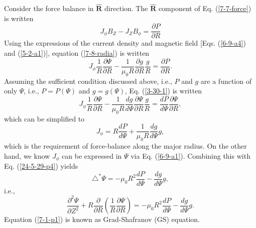 \documentclass{llncs}
\begin{document}
Consider the force balance in $\hat{\mathbf{R}}$ direction. The
$\hat{\mathbf{R}}$ component of Eq. (\ref{7-7-force}) is written
\begin{equation}
  \label{7-8-radia} J_{\phi} B_Z - J_Z B_{\phi} = \frac{\partial P}{\partial
  R}
\end{equation}
Using the expressions of the current density and magnetic field [Eqs.
(\ref{6-9-a4}) and (\ref{5-2-a1})], equation (\ref{7-8-radia}) is written
\begin{equation}
  \label{3-30-1} J_{\phi} \frac{1}{R} \frac{\partial \Psi}{\partial R} -
  \frac{1}{\mu_0 R} \frac{\partial g}{\partial R}  \frac{g}{R} =
  \frac{\partial P}{\partial R} .
\end{equation}
Assuming the sufficient condition discussed above, i.e., $P$ and $g$ are a
function of only $\Psi$, i.e., $P = P (\Psi)$ and $g = g (\Psi)$, Eq.
(\ref{3-30-1}) is written
\begin{equation}
  J_{\phi} \frac{1}{R} \frac{\partial \Psi}{\partial R} - \frac{1}{\mu_0 R}
  \frac{d g}{d \Psi} \frac{\partial \Psi}{\partial R}  \frac{g}{R} = \frac{d
  P}{d \Psi} \frac{\partial \Psi}{\partial R},
\end{equation}
which can be simplified to
\begin{equation}
  \label{24-5-29-p4} J_{\phi} = R \frac{d P}{d \Psi} + \frac{1}{\mu_0 R}
  \frac{d g}{d \Psi} g,
\end{equation}
which is the requirement of force-balance along the major radius. On the other
hand, we know $J_{\phi}$ can be expressed in $\Psi$ via Eq. (\ref{6-9-a1}).
Combining this with Eq. (\ref{24-5-29-p4}) yields
\begin{equation}
  \triangle^{\ast} \Psi = - \mu_0 R^2 \frac{d P}{d \Psi} - \frac{d g}{d \Psi}
  g,
\end{equation}
i.e.,
\begin{equation}
  \label{7-1-p1} \frac{\partial^2 \Psi}{\partial Z^2} + R
  \frac{\partial}{\partial R} \left( \frac{1}{R} \frac{\partial \Psi}{\partial
  R} \right) = - \mu_0 R^2 \frac{d P}{d \Psi} - \frac{d g}{d \Psi} g.
\end{equation}
Equation (\ref{7-1-p1}) is known as Grad-Shafranov (GS) equation.
\end{document}
